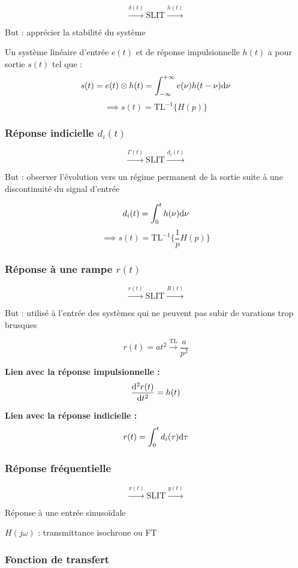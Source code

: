 \documentclass[a4paper,12pt]{article}
\begin{document}
\[ \xrightarrow{\delta(t)} \mathrm{SLIT} \xrightarrow{h(t)} \]

But : apprécier la stabilité du système

Un système linéaire d'entrée $e(t)$ et de réponse impulsionnelle $h(t)$ a pour sortie $s(t)$ tel que :
\[ s(t) = e(t) \otimes h(t) = \int_{-\infty}^{+\infty} e(\nu) h(t - \nu) \mathrm{d}\nu\]
\[ \implies s(t) = \mathrm{TL}^{-1} \{ H(p) \} \]

\subsubsection{Réponse indicielle $d_i(t)$}

\[ \xrightarrow{\Gamma(t)} \mathrm{SLIT} \xrightarrow{d_i(t)} \]

But : observer l'évolution vers un régime permanent de la sortie suite à une discontinuité du signal d'entrée

\[ d_i(t) = \int_0^t h(\nu) \mathrm{d}\nu \]
\[ \implies s(t) = \mathrm{TL}^{-1} \{ \frac{1}{p} H(p) \} \]

\subsubsection{Réponse à une rampe $r(t)$}

\[ \xrightarrow{r(t)} \mathrm{SLIT} \xrightarrow{R(t)} \]

But : utilisé à l'entrée des systèmes qui ne peuvent pas subir de varations trop brusques

\[ r(t) = at^2 \xrightarrow{\mathrm{TL}} \dfrac{a}{p^2} \]

\textbf{Lien avec la réponse impulsionnelle :}
\[ \dfrac{\mathrm{d}^2 r(t)}{\mathrm{d}t^2} = h(t) \]

\textbf{Lien avec la réponse indicielle :}
\[ r(t) = \int_0^t d_i(\tau) \mathrm{d}\tau \]

\subsubsection{Réponse fréquentielle}

\[ \xrightarrow{x(t)} \mathrm{SLIT} \xrightarrow{y(t)} \]

Réponse à une entrée sinusoïdale

$H(j\omega)$ : transmittance isochrone ou FT

\subsubsection{Fonction de transfert}
\end{document}
